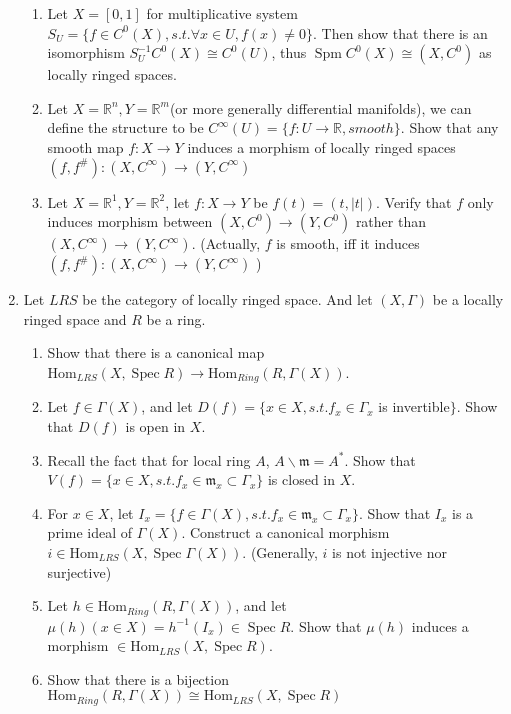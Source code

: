 \documentclass[a4paper,11pt]{article}
\def\bb#1{\mathbb{#1}}
\def\Hom{\mathrm{Hom}}
\DeclareMathOperator{\Spm}{Spm}
\DeclareMathOperator{\Spec}{Spec}
\begin{document}
\begin{enumerate}[1.]
\begin{enumerate}
    \item Let $X=[0,1]$ for multiplicative system $S_U=\{f\in C^0(X), s.t. \forall x\in U, f(x)\neq 0 \}$. Then show that there is an isomorphism $S_U^{-1}C^0(X)\cong C^0(U)$, thus $\Spm C^0(X)\cong (X, C^0)$ as locally ringed spaces.
    \item Let $X=\bb{R}^n, Y=\bb{R}^m$(or more generally differential manifolds), we can define the structure to be  $C^{\infty}(U)=\{f: U\to \bb{R}, smooth\}$. Show that any smooth map $f: X\to Y$ induces a morphism of locally ringed spaces $ (f,f^\#) : (X,C^{\infty})\to (Y,C^{\infty}) $
    \item Let $X=\bb{R}^1, Y=\bb{R}^2$, let $f: X\to Y $ be $f(t)=(t,|t|)$. Verify that $f$ only induces morphism between $ (X,C^0)\to (Y,C^0)$ rather than $ (X,C^{\infty})\to (Y,C^{\infty})$. (Actually, $f$ is smooth, iff it induces $ (f,f^\#) : (X,C^{\infty})\to (Y,C^{\infty}) $ )
\end{enumerate}
\item Let $LRS$ be the category of locally ringed space. And let $(X,\Gamma)$ be a locally ringed space and $R$ be a ring.
\begin{enumerate}
    \item Show that there is a canonical map \\ $\Hom_{LRS}(X,\Spec R) \to \Hom_{Ring}(R,\Gamma(X)) $.
    \item Let $f\in \Gamma(X)$, and let $D(f)=\{x\in X, s.t. f_x \in \Gamma_x$ is invertible$\}$. Show that $D(f)$ is open in $X$.
    \item Recall the fact that for local ring $A$, $A\backslash \mathfrak{m}= A^*$. Show that $V(f)=\{x\in X, s.t. f_x \in \mathfrak{m}_x\subset \Gamma_x\}$ is closed in $X$.
    \item For $x\in X$, let $I_x =\{f\in \Gamma(X), s.t. f_x \in \mathfrak{m}_x\subset \Gamma_x \}$. Show that $I_x$ is a prime ideal of $ \Gamma(X)$. Construct a canonical morphism $i\in \Hom_{LRS}(X,\Spec \Gamma(X))$. (Generally, $i$ is not injective nor surjective)
    \item Let $h\in \Hom_{Ring}(R,\Gamma(X))$, and let $\mu(h)(x\in X)=h^{-1}(I_x)\in \Spec R$. Show that $\mu(h)$ induces a morphism $\in \Hom_{LRS}(X,\Spec R)$.
    \item Show that there is a bijection $\Hom_{Ring}(R,\Gamma(X))\cong \Hom_{LRS}(X,\Spec R)$
\end{enumerate}


\end{enumerate}
\end{document}
